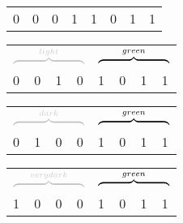 \begin{frame}
\begin{columns}
\begin{overlayarea}{\textwidth}{\textheight}
{\begin{table}[]
\begin{tabular}{llll|l|l|l|l|}
				\cline{5-8}
				{\color[HTML]{C0C0C0} 0} & {\color[HTML]{C0C0C0} 0} & {\color[HTML]{C0C0C0} 0} & {\color[HTML]{C0C0C0} 1} & 1 & 0 & 1 & 1 \\ \cline{5-8} 
				\end{tabular}
			\end{table}
			\begin{table}[]
				\centering
				\begin{tabular}{llll|l|l|l|l|}
				\multicolumn{4}{c}{$\color{gray!50}\overbrace{\color{black}\rule{2.2cm}{0pt}}^{\textcolor{gray!40}{light}}$} & \multicolumn{4}{c}{$\overbrace{\rule{2.2cm}{0pt}}^{green}$}\\
				\cline{5-8}
				{\color[HTML]{C0C0C0} 0} & {\color[HTML]{C0C0C0} 0} & {\color[HTML]{C0C0C0} 1} & {\color[HTML]{C0C0C0} 0} & 1 & 0 & 1 & 1 \\ \cline{5-8} 
				\end{tabular}
			\end{table}
			\begin{table}[]
				\centering
				\begin{tabular}{llll|l|l|l|l|}
				\multicolumn{4}{c}{$\color{gray!50}\overbrace{\color{black}\rule{2.2cm}{0pt}}^{\textcolor{gray!40}{dark}}$} & \multicolumn{4}{c}{$\overbrace{\rule{2.2cm}{0pt}}^{green}$}\\
				\cline{5-8}
				{\color[HTML]{C0C0C0} 0} & {\color[HTML]{C0C0C0} 1} & {\color[HTML]{C0C0C0} 0} & {\color[HTML]{C0C0C0} 0} & 1 & 0 & 1 & 1 \\ \cline{5-8} 
				\end{tabular}
			\end{table}
			\begin{table}[]
				\centering
				\begin{tabular}{llll|l|l|l|l|}
				\multicolumn{4}{c}{$\color{gray!50}\overbrace{\color{black}\rule{2.2cm}{0pt}}^{\textcolor{gray!40}{very dark}}$} & \multicolumn{4}{c}{$\overbrace{\rule{2.2cm}{0pt}}^{green}$}\\
				\cline{5-8}
				{\color[HTML]{C0C0C0} 1} & {\color[HTML]{C0C0C0} 0} & {\color[HTML]{C0C0C0} 0} & {\color[HTML]{C0C0C0} 0} & 1 & 0 & 1 & 1 \\ \cline{5-8} 
				\end{tabular}
			\end{table}
			}
		\end{overlayarea}
		\begin{overlayarea}{\textwidth}{\textheight}
			\footnotesize{
				\begin{itemize}\justifying

\end{itemize}}
\end{overlayarea}
\end{columns}
\end{frame}
